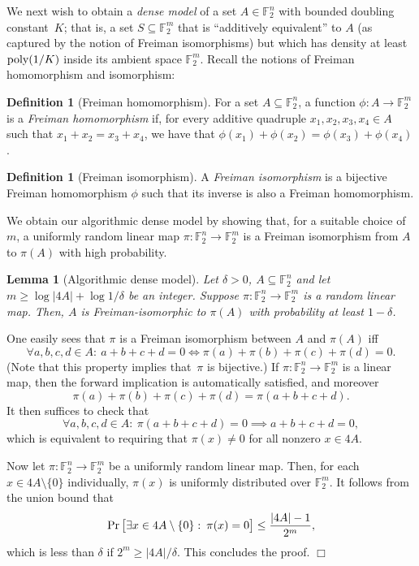 \documentclass[11pt]{amsart}
\renewcommand{\Pr}{\mathop{\mbox{\rm Pr}}}
\newcommand{\F}{\mathbb{F}} %
\newcommand{\poly}{\mbox{\rm poly}}
\theoremstyle{plain}
\newtheorem{lemma}[theorem]{Lemma}
\theoremstyle{definition}
\newtheorem{definition}[theorem]{Definition}
\theoremstyle{remark}
\renewenvironment{proof}[1][]{
    	\begin{trivlist}
     	\item[\hspace{\labelsep}{\em\noindent Proof#1:\/}]}
     	{{\hfill$\Box$}
    	\end{trivlist}
  }
\begin{document}
We next wish to obtain a \emph{dense model} of a set $A\in \F_2^n$ with bounded doubling constant~$K$;
that is, a set $S \subseteq \F_2^m$ that is ``additively equivalent'' to $A$ (as captured by the notion of Freiman isomorphisms) but which has density at least $\poly(1/K)$ inside its ambient space $\F_2^m$.
Recall the notions of Freiman homomorphism and isomorphism:

\begin{definition}[Freiman homomorphism]
For a set $A\subseteq \F_2^n$, a function $\phi: A\rightarrow \F_2^m$ is a \emph{Freiman homomorphism} if, for every additive quadruple $x_1, x_2, x_3, x_4\in A$ such that $x_1+x_2=x_3+x_4$, we have that $\phi(x_1)+\phi(x_2)=\phi(x_3)+\phi(x_4)$.
\end{definition}

\begin{definition}[Freiman isomorphism]
   A \emph{Freiman isomorphism} is a bijective Freiman homomorphism $\phi$ such that its inverse is also a Freiman homomorphism.
\end{definition}

We obtain our algorithmic dense model by showing that, for a suitable choice of~$m$, a uniformly random linear map $\pi: \F_2^n \to \F_2^m$ is a Freiman isomorphism from $A$ to $\pi(A)$ with high probability.

\begin{lemma}[Algorithmic dense model]
\label{lem:randomFreiman}
    Let $\delta > 0$,  $A\subseteq \F_2^n$ and  let $m \geq \log |4A| + \log 1/\delta$ be an integer.
    Suppose $\pi: \F_2^n \rightarrow \F_2^m$ is a random linear map.
    Then, $A$ is Freiman-isomorphic to $\pi(A)$ with probability at least $1-\delta$.
\end{lemma}

\begin{proof}
One easily sees that $\pi$ is a Freiman isomorphism between $A$ and $\pi(A)$ iff
$$
\forall a, b, c, d\in A:\: a+b+c+d = 0 \iff \pi(a)+\pi(b) + \pi(c)+\pi(d) = 0.
$$
(Note that this property implies that~$\pi$ is bijective.)
If $\pi: \F_2^n \rightarrow \F_2^m$ is a linear map, then the forward implication is automatically satisfied, and moreover
$$\pi(a)+\pi(b) + \pi(c)+\pi(d) = \pi(a+b+c+d).$$
It then suffices to check that
$$\forall a, b, c, d\in A:\: \pi(a+b+c+d) = 0 \implies a+b+c+d = 0,$$
which is equivalent to requiring that $\pi(x) \neq 0$ for all nonzero $x\in 4A$.

Now let $\pi: \F_2^n \rightarrow \F_2^m$ be a uniformly random linear map.
Then, for each $x\in 4A\setminus\{0\}$ individually, $\pi(x)$ is uniformly distributed over $\F_2^m$.
It follows from the union bound that
$$
\Pr\big[\exists x\in 4A\setminus\{0\}:\: \pi(x) = 0\big] \leq \frac{|4A|-1}{2^m},
$$
which is less than $\delta$ if $2^m \geq |4A|/\delta$.
This concludes the proof.
\end{proof}
\end{document}
